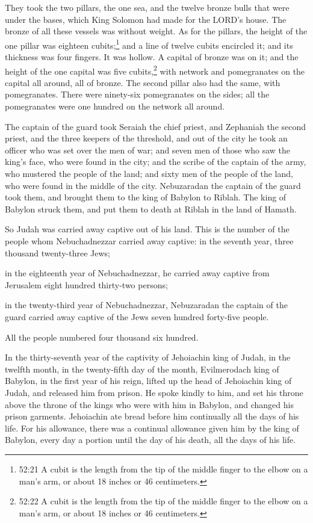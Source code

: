 \myverse{}They took the two pillars, the one sea, and the twelve bronze bulls that were under the bases, which King Solomon had made for the LORD’s house. The bronze of all these vessels was without weight. \myverse{}As for the pillars, the height of the one pillar was eighteen cubits;\footnote{52:21 A cubit is the length from the tip of the middle finger to the elbow on a man’s arm, or about 18 inches or 46 centimeters.} and a line of twelve cubits encircled it; and its thickness was four fingers. It was hollow. \myverse{}A capital of bronze was on it; and the height of the one capital was five cubits,\footnote{52:22 A cubit is the length from the tip of the middle finger to the elbow on a man’s arm, or about 18 inches or 46 centimeters.} with network and pomegranates on the capital all around, all of bronze. The second pillar also had the same, with pomegranates. \myverse{}There were ninety-six pomegranates on the sides; all the pomegranates were one hundred on the network all around.


\myverse{}The captain of the guard took Seraiah the chief priest, and Zephaniah the second priest, and the three keepers of the threshold, \myverse{}and out of the city he took an officer who was set over the men of war; and seven men of those who saw the king’s face, who were found in the city; and the scribe of the captain of the army, who mustered the people of the land; and sixty men of the people of the land, who were found in the middle of the city. \myverse{}Nebuzaradan the captain of the guard took them, and brought them to the king of Babylon to Riblah. \myverse{}The king of Babylon struck them, and put them to death at Riblah in the land of Hamath.

So Judah was carried away captive out of his land. \myverse{}This is the number of the people whom Nebuchadnezzar carried away captive: in the seventh year, three thousand twenty-three Jews;


\myverse{}in the eighteenth year of Nebuchadnezzar, he carried away captive from Jerusalem eight hundred thirty-two persons;


\myverse{}in the twenty-third year of Nebuchadnezzar, Nebuzaradan the captain of the guard carried away captive of the Jews seven hundred forty-five people.

All the people numbered four thousand six hundred.


\myverse{}In the thirty-seventh year of the captivity of Jehoiachin king of Judah, in the twelfth month, in the twenty-fifth day of the month, Evilmerodach king of Babylon, in the first year of his reign, lifted up the head of Jehoiachin king of Judah, and released him from prison. \myverse{}He spoke kindly to him, and set his throne above the throne of the kings who were with him in Babylon, \myverse{}and changed his prison garments. Jehoiachin ate bread before him continually all the days of his life. \myverse{}For his allowance, there was a continual allowance given him by the king of Babylon, every day a portion until the day of his death, all the days of his life.


